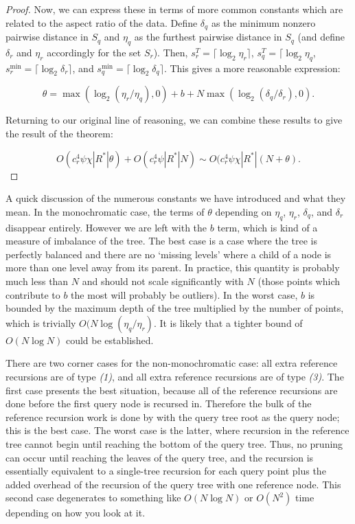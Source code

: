 \begin{proof}
Now, we can express these in terms of more common constants which are related to
the aspect ratio of the data.  Define $\delta_q$ as the minimum nonzero pairwise
distance in $S_q$ and $\eta_q$ as the furthest pairwise distance in $S_q$ (and
define $\delta_r$ and $\eta_r$ accordingly for the set $S_r$).  Then, $s_r^T =
\lceil \log_2 \eta_r \rceil$, $s_q^T = \lceil \log_2 \eta_q$, $s_r^{\min} =
\lceil \log_2 \delta_r \rceil$, and $s_q^{\min} = \lceil \log_2 \delta_q
\rceil$.  This gives a more reasonable expression:

\begin{equation}
\theta = \max(\log_2(\eta_r / \eta_q), 0) + b + N \max(\log_2(\delta_q /
\delta_r), 0).
\end{equation}

Returning to our original line of reasoning, we can combine these results to
give the result of the theorem:

\begin{equation}
O(c_r^4 \psi \chi | R^* | \theta) + O(c_r^4 \psi | R^* | N) \sim O(c_r^4 \psi
\chi |R^*| (N + \theta).
\end{equation}
\end{proof}

A quick discussion of the numerous constants we have introduced and what they
mean.  In the monochromatic case, the terms of $\theta$ depending on $\eta_q$,
$\eta_r$, $\delta_q$, and $\delta_r$ disappear entirely.  However we are left
with the $b$ term, which is kind of a measure of imbalance of the tree.  The
best case is a case where the tree is perfectly balanced and there are no
`missing levels' where a child of a node is more than one level away from its
parent.  In practice, this quantity is probably much less than $N$ and should
not scale significantly with $N$ (those points which contribute to $b$ the most
will probably be outliers).  In the worst case, $b$ is bounded by the maximum
depth of the tree multiplied by the number of points, which is trivially $O(N
\log (\eta_q / \eta_r)$.  It is likely that a tighter bound of $O(N \log N)$
could be established.

There are two corner cases for the non-monochromatic case: all extra reference
recursions are of type \textit{(1)}, and all extra reference recursions are of
type \textit{(3)}.  The first case presents the best situation, because all of
the reference recursions are done before the first query node is recursed in.
Therefore the bulk of the reference recursion work is done by with the query
tree root as the query node; this is the best case.  The worst case is the
latter, where recursion in the reference tree cannot begin until reaching the
bottom of the query tree.  Thus, no pruning can occur until reaching the leaves
of the query tree, and the recursion is essentially equivalent to a single-tree
recursion for each query point plus the added overhead of the recursion of the
query tree with one reference node.  This second case degenerates to something
like $O(N \log N)$ or $O(N^2)$ time depending on how you look at it.

